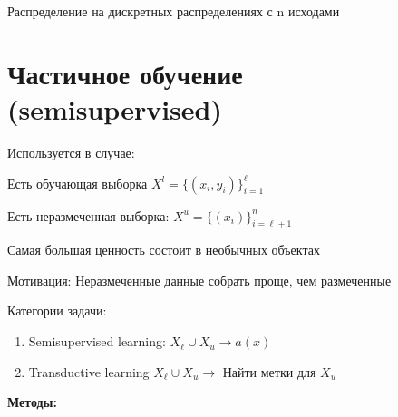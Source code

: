 \documentclass[a4paper, 12pt]{article}
\begin{document}
Распределение на дискретных распределениях с n исходами

\section{Частичное обучение (semisupervised)}

Используется в случае:

Есть обучающая выборка $X^l = \{(x_i, y_i)\}_{i = 1}^{\ell}$

Есть неразмеченная выборка: $X^u = \{(x_i)\}_{i = \ell + 1}^{n}$

Самая большая ценность состоит в необычных объектах

Мотивация: Неразмеченные данные собрать проще, чем размеченные

Категории задачи:

\begin{enumerate}
    \item Semisupervised learning: $X_{\ell} \cup X_u \rightarrow a(x)$
    \item Transductive learning $X_{\ell} \cup X_u \rightarrow$ Найти метки для $X_u$
\end{enumerate}

\textbf{Методы:}
\end{document}
